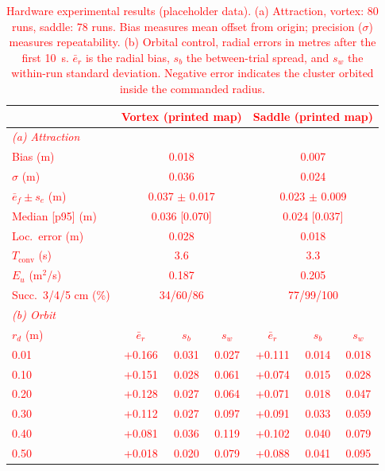 \documentclass[lettersize,journal]{IEEEtran}
\newcommand{\syn}[1]{\textcolor{red}{#1}}            %
\begin{document}
\begin{table}[!t]
    \footnotesize
    \centering
    \caption{Hardware experimental results \syn{(placeholder data)}. (a) Attraction, vortex: \syn{80} runs, saddle: \syn{78} runs. Bias measures mean offset from origin; precision ($\sigma$) measures repeatability. (b) Orbital control, radial errors in metres after the first 10~s. $\bar e_r$ is the radial bias, $s_b$ the between-trial spread, and $s_w$ the within-run standard deviation. Negative error indicates the cluster orbited inside the commanded radius.} %
    \label{tab:estimation_results}\label{tab:orbital_radius_comparison}
    \setlength{\tabcolsep}{4pt}
    \syn{\begin{tabular}{l|ccc|ccc}
    \hline
     & \multicolumn{3}{c|}{\textbf{Vortex (printed map)}} & \multicolumn{3}{c}{\textbf{Saddle (printed map)}} \\
    \hline
    \multicolumn{7}{l}{\textit{(a) Attraction}} \\
    \hline
    Bias (m) & \multicolumn{3}{c|}{0.018} & \multicolumn{3}{c}{0.007} \\
    $\sigma$ (m) & \multicolumn{3}{c|}{0.036} & \multicolumn{3}{c}{0.024} \\
    $\bar{e}_f \pm s_e$ (m) & \multicolumn{3}{c|}{0.037 $\pm$ 0.017} & \multicolumn{3}{c}{0.023 $\pm$ 0.009} \\
    Median [p95] (m) & \multicolumn{3}{c|}{0.036 [0.070]} & \multicolumn{3}{c}{0.024 [0.037]} \\
    Loc.\ error (m) & \multicolumn{3}{c|}{0.028} & \multicolumn{3}{c}{0.018} \\
    $T_{\mathrm{conv}}$ (s) & \multicolumn{3}{c|}{3.6} & \multicolumn{3}{c}{3.3} \\
    $E_u$ (m$^2$/s) & \multicolumn{3}{c|}{0.187} & \multicolumn{3}{c}{0.205} \\
    Succ.\ 3/4/5 cm (\%) & \multicolumn{3}{c|}{34/60/86} & \multicolumn{3}{c}{77/99/100} \\
    \hline
    \multicolumn{7}{l}{\textit{(b) Orbit}} \\
    \hline
    $r_d$ (m) & $\bar e_r$ & $s_b$ & $s_w$ & $\bar e_r$ & $s_b$ & $s_w$ \\
    \hline
    0.01 & +0.166 & 0.031 & 0.027 & +0.111 & 0.014 & 0.018 \\
    0.10 & +0.151 & 0.028 & 0.061 & +0.074 & 0.015 & 0.028 \\
    0.20 & +0.128 & 0.027 & 0.064 & +0.071 & 0.018 & 0.047 \\
    0.30 & +0.112 & 0.027 & 0.097 & +0.091 & 0.033 & 0.059 \\
    0.40 & +0.081 & 0.036 & 0.119 & +0.102 & 0.040 & 0.079 \\
    0.50 & +0.018 & 0.020 & 0.079 & +0.088 & 0.041 & 0.095 \\
    \hline
    \end{tabular}} %
    \end{table}
\end{document}
